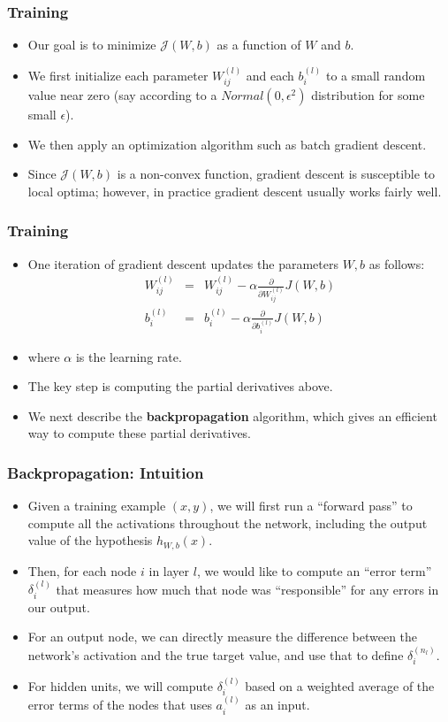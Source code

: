 \documentclass{beamer}
\newcommand{\beqn}[1]{\vspace{-0.03in}\begin{eqnarray}#1\end{eqnarray}\vspace{-0.03in}}
\begin{document}
\begin{frame}
\frametitle{Training}
\begin{itemize}
\item Our goal is to minimize $\mathcal{J}(W, b)$ as a function of $W$ and $b$.

\item We first initialize each parameter $W_{ij}^{(l)}$ and each $b_i^{(l)}$ to a small random value near zero (say according to a $Normal(0, \epsilon^2)$ distribution for some small $\epsilon$).

\item We then apply an optimization algorithm such as batch gradient descent.

\item Since $\mathcal{J}(W,b)$ is a non-convex function, gradient descent is susceptible to local optima; however, in practice gradient descent usually works fairly well. 
\end{itemize}
\end{frame}

\begin{frame}
\frametitle{Training}
\begin{itemize}
\item One iteration of gradient descent updates the parameters $W, b$ as follows:
\beqn{
W_{ij}^{(l)}&=& W_{ij}^{(l)}-\alpha \frac{\partial}{\partial W_{ij}^{(l)}}J(W, b)\\
b_i^{(l)} &=& b_i^{(l)} - \alpha \frac{\partial}{\partial b_i^{(l)}}J(W, b)
}

\item where $\alpha$  is the learning rate. 
\item The key step is computing the partial derivatives above.
\item We next describe the \textbf{backpropagation} algorithm, which gives an efficient way to compute these partial derivatives.
\end{itemize}
\end{frame}

\begin{frame}
\frametitle{Backpropagation: Intuition}
\begin{itemize}
\item Given a training example $(x,y)$, we will first run a ``forward pass'' to compute all the activations throughout the network, including the output value of the hypothesis $h_{W,b}(x)$.
\item Then, for each node $i$ in layer $l$, we would like to compute an ``error term'' $\delta^{(l)}_i$ that measures how much that node was ``responsible'' for any errors in our output. 
\item For an output node, we can directly measure the difference between the network's activation and the true target value, and use that to define $\delta^{(n_l)}_i$. 
\item For hidden units, we will compute $\delta^{(l)}_i$ based on a weighted average of the error terms of the nodes that uses $a^{(l)}_i$ as an input.
\end{itemize}
\end{frame}
\end{document}

